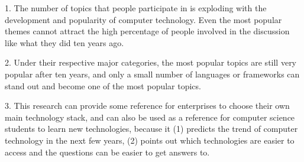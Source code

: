 \documentclass[english,preprint,JIP]{ipsj}
\begin{document}
1. The number of topics that people participate in is exploding with the development and popularity of computer technology. Even the most popular themes cannot attract the high percentage of people involved in the discussion like what they did ten years ago.
\smallskip\smallskip

2. Under their respective major categories, the most popular topics are still very popular after ten years, and only a small number of languages or frameworks can stand out and become one of the most popular topics.
\smallskip\smallskip

3. This research can provide some reference for enterprises to choose their own main technology stack, and can also be used as a reference for computer science students to learn new technologies, because it (1) predicts the trend of computer technology in the next few years, (2) points out which technologies are easier to access and the questions can be easier to get answers to.



\end{document}
